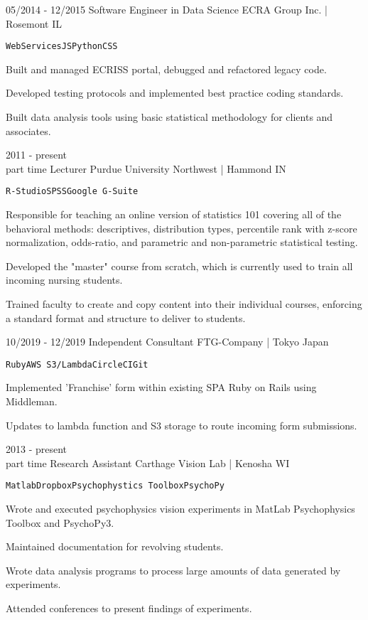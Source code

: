 \documentclass[9pt]{developercv} %
\begin{document}
\begin{entrylist}
{}
	\entry
		{05/2014 - 12/2015}
		{Software Engineer in Data Science}
		{ECRA Group Inc. | Rosemont IL}
		{
		\texttt{WebServices}\slashsep\texttt{JS}\slashsep\texttt{Python}\slashsep\texttt{CSS}
		 \begin{compactitem}
		 \item Built and managed ECRISS portal, debugged and refactored legacy code. 
		 \item Developed testing protocols and implemented best practice coding standards. 
		 \item Built data analysis tools using basic statistical methodology for clients and associates.
		 \end{compactitem}
		 }
	\entry
		{2011 - present \\\footnotesize{part time}}
		{Lecturer}
		{Purdue University Northwest | Hammond IN}
		{
		\texttt{R-Studio}\slashsep\texttt{SPSS}\slashsep\texttt{Google G-Suite}
		 \begin{compactitem}
		\item Responsible for teaching an online version of statistics 101 covering all of the behavioral methods: descriptives, distribution types, percentile rank with z-score normalization, odds-ratio, and parametric and non-parametric statistical testing. 
		\item Developed the "master" course from scratch, which is currently used to train all incoming nursing students. 
		\item Trained faculty to create and copy content into their individual courses, enforcing a standard format  and structure to deliver to students. 
		 \end{compactitem}}

	\entry
		{10/2019 - 12/2019}
		{Independent Consultant}
		{FTG-Company | Tokyo Japan}
		 {
		 \texttt{Ruby}\slashsep\texttt{AWS S3/Lambda}\slashsep\texttt{CircleCI}\slashsep\texttt{Git}
		 \begin{compactitem}
		 \item Implemented 'Franchise' form within existing SPA Ruby on Rails using Middleman. 
		 \item Updates to lambda function and S3 storage to route incoming form submissions.  	
		 		 \end{compactitem}
}	
	
	\entry
		{2013 - present \\\footnotesize{part time}}
		{Research Assistant}
		{Carthage Vision Lab | Kenosha WI}
		{
		\texttt{Matlab}\slashsep\texttt{Dropbox}\slashsep\texttt{Psychophystics Toolbox}\slashsep\texttt{PsychoPy}
		 \begin{compactitem}
		 \item Wrote and executed psychophysics vision experiments in MatLab Psychophysics Toolbox and PsychoPy3. 
		 \item Maintained documentation for revolving students. 
		 \item Wrote data analysis programs to process large amounts of data generated by experiments. 
		 \item Attended conferences to present findings of experiments. 
		 \end{compactitem}		
		}
\end{entrylist}
\end{document}
